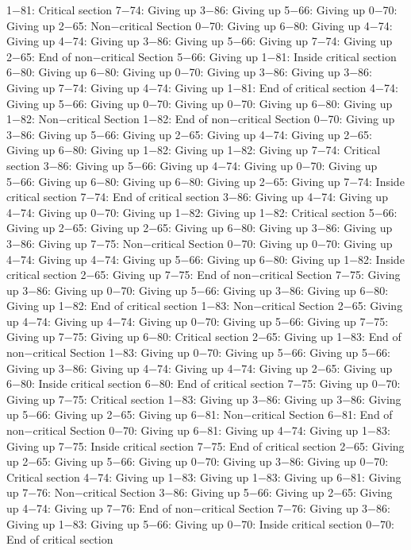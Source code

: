 1−81: Critical section
7−74: Giving up
3−86: Giving up
5−66: Giving up
0−70: Giving up
2−65: Non−critical Section
0−70: Giving up
6−80: Giving up
4−74: Giving up
4−74: Giving up
3−86: Giving up
5−66: Giving up
7−74: Giving up
2−65: End of non−critical Section
5−66: Giving up
1−81: Inside critical section
6−80: Giving up
6−80: Giving up
0−70: Giving up
3−86: Giving up
3−86: Giving up
7−74: Giving up
4−74: Giving up
1−81: End of critical section
4−74: Giving up
5−66: Giving up
0−70: Giving up
0−70: Giving up
6−80: Giving up
1−82: Non−critical Section
1−82: End of non−critical Section
0−70: Giving up
3−86: Giving up
5−66: Giving up
2−65: Giving up
4−74: Giving up
2−65: Giving up
6−80: Giving up
1−82: Giving up
1−82: Giving up
7−74: Critical section
3−86: Giving up
5−66: Giving up
4−74: Giving up
0−70: Giving up
5−66: Giving up
6−80: Giving up
6−80: Giving up
2−65: Giving up
7−74: Inside critical section
7−74: End of critical section
3−86: Giving up
4−74: Giving up
4−74: Giving up
0−70: Giving up
1−82: Giving up
1−82: Critical section
5−66: Giving up
2−65: Giving up
2−65: Giving up
6−80: Giving up
3−86: Giving up
3−86: Giving up
7−75: Non−critical Section
0−70: Giving up
0−70: Giving up
4−74: Giving up
4−74: Giving up
5−66: Giving up
6−80: Giving up
1−82: Inside critical section
2−65: Giving up
7−75: End of non−critical Section
7−75: Giving up
3−86: Giving up
0−70: Giving up
5−66: Giving up
3−86: Giving up
6−80: Giving up
1−82: End of critical section
1−83: Non−critical Section
2−65: Giving up
4−74: Giving up
4−74: Giving up
0−70: Giving up
5−66: Giving up
7−75: Giving up
7−75: Giving up
6−80: Critical section
2−65: Giving up
1−83: End of non−critical Section
1−83: Giving up
0−70: Giving up
5−66: Giving up
5−66: Giving up
3−86: Giving up
4−74: Giving up
4−74: Giving up
2−65: Giving up
6−80: Inside critical section
6−80: End of critical section
7−75: Giving up
0−70: Giving up
7−75: Critical section
1−83: Giving up
3−86: Giving up
3−86: Giving up
5−66: Giving up
2−65: Giving up
6−81: Non−critical Section
6−81: End of non−critical Section
0−70: Giving up
6−81: Giving up
4−74: Giving up
1−83: Giving up
7−75: Inside critical section
7−75: End of critical section
2−65: Giving up
2−65: Giving up
5−66: Giving up
0−70: Giving up
3−86: Giving up
0−70: Critical section
4−74: Giving up
1−83: Giving up
1−83: Giving up
6−81: Giving up
7−76: Non−critical Section
3−86: Giving up
5−66: Giving up
2−65: Giving up
4−74: Giving up
7−76: End of non−critical Section
7−76: Giving up
3−86: Giving up
1−83: Giving up
5−66: Giving up
0−70: Inside critical section
0−70: End of critical section
